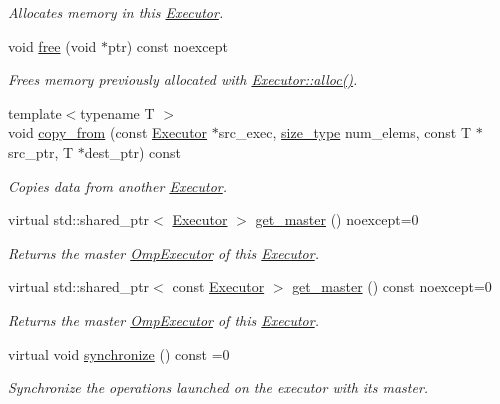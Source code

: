\begin{DoxyCompactItemize}
\begin{DoxyCompactList}\small\item\em Allocates memory in this \hyperlink{classgko_1_1Executor}{Executor}. \end{DoxyCompactList}\item 
void \hyperlink{classgko_1_1Executor_a0befe43d21c93e199d1620eaae4ccc0c}{free} (void $\ast$ptr) const noexcept
\begin{DoxyCompactList}\small\item\em Frees memory previously allocated with \hyperlink{classgko_1_1Executor_a5a216c2b1f7ceb8a0190c08941c1c687}{Executor\+::alloc()}. \end{DoxyCompactList}\item 
{\footnotesize template$<$typename T $>$ }\\void \hyperlink{classgko_1_1Executor_adf7573e4a7e267fcb821eb9049a1054f}{copy\+\_\+from} (const \hyperlink{classgko_1_1Executor}{Executor} $\ast$src\+\_\+exec, \hyperlink{namespacegko_a6e5c95df0ae4e47aab2f604a22d98ee7}{size\+\_\+type} num\+\_\+elems, const T $\ast$src\+\_\+ptr, T $\ast$dest\+\_\+ptr) const
\begin{DoxyCompactList}\small\item\em Copies data from another \hyperlink{classgko_1_1Executor}{Executor}. \end{DoxyCompactList}\item 
virtual std\+::shared\+\_\+ptr$<$ \hyperlink{classgko_1_1Executor}{Executor} $>$ \hyperlink{classgko_1_1Executor_acaec4f999d52fc71e5e5a3d3ad93609c}{get\+\_\+master} () noexcept=0
\begin{DoxyCompactList}\small\item\em Returns the master \hyperlink{classgko_1_1OmpExecutor}{Omp\+Executor} of this \hyperlink{classgko_1_1Executor}{Executor}. \end{DoxyCompactList}\item 
virtual std\+::shared\+\_\+ptr$<$ const \hyperlink{classgko_1_1Executor}{Executor} $>$ \hyperlink{classgko_1_1Executor_a261386e439c8daa6e0d95dc331b9bfeb}{get\+\_\+master} () const noexcept=0
\begin{DoxyCompactList}\small\item\em Returns the master \hyperlink{classgko_1_1OmpExecutor}{Omp\+Executor} of this \hyperlink{classgko_1_1Executor}{Executor}. \end{DoxyCompactList}\item 
\mbox{\label{classgko_1_1Executor_a24eeee7648c0f0fd07c9866d07154875}} 
virtual void \hyperlink{classgko_1_1Executor_a24eeee7648c0f0fd07c9866d07154875}{synchronize} () const =0
\begin{DoxyCompactList}\small\item\em Synchronize the operations launched on the executor with its master. \end{DoxyCompactList}\end{DoxyCompactItemize}


